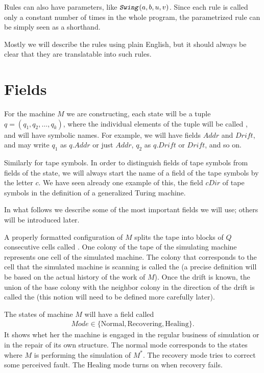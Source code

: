 \documentclass[12pt]{memoir}
\newcommand{\fld}[1]{\ensuremath{\textit{#1}}}
\newcommand{\rul}[1]{\ensuremath{\texttt{\slshape #1\/}}}
\newcommand{\Addr}{\fld{Addr}}
\newcommand{\cDir}{\fld{cDir}}
\newcommand{\Drift}{\fld{Drift}}
\newcommand{\Mode}{\fld{Mode}}
\newcommand{\Healing}{\mathrm{Healing}}
\newcommand{\Normal}{\mathrm{Normal}}
\newcommand{\Recovering}{\mathrm{Recovering}}
\newcommand{\ruSwing}{\rul{Swing}}
\begin{document}
Rules can also have parameters, like $\ruSwing(a,b,u,v)$.
Since each rule is called only a constant number of times in the whole program,
the parametrized rule can be simply seen as a shorthand.

Mostly we will describe
the rules using plain English, but it should always be clear that they
are translatable into such rules.


\section{Fields}\label{sec:fields}

\begin{sloppypar}
For the machine \( M \) we are constructing, each state will 
be a tuple \( q=(q_{1},q_{2},\dots,q_{k}) \),
where the individual elements of the tuple will be called , and will
have symbolic names.
For example, we will have fields \( \Addr \) and \( \Drift \),
and may write \( q_{1} \) as \( q.\Addr \) or just \( \Addr \), 
\( q_{2} \) as \( q.\Drift \) or \( \Drift \), and so on.
\end{sloppypar}

Similarly for tape symbols.
In order to distinguish fields of tape symbols from fields of the state,
we will always start the name of a field of the tape symbols by the letter \( c \).
We have seen already one example of this, the field \( \cDir \) of tape symbols
in the definition of a generalized Turing machine.

In what follows we describe some of the most important fields we will use;
others will be introduced later.

A properly formatted configuration of \( M \) splits the tape into blocks of \( Q \)
consecutive cells called .
One colony of the tape of the simulating
machine represents one cell of the simulated machine.
The colony that corresponds to the cell that the
simulated machine is scanning is called the 
(a precise definition will be based on the actual history of the work of \( M \)).
Once the drift is known, the union of the base colony with the neighbor colony in
the direction of the drift is called the  (this notion will 
need to be defined more carefully later).

The states of machine \( M \) will have a field called 
 \begin{align*}
   \Mode\in\{ \Normal,\Recovering, \Healing \}.
 \end{align*}
It shows whet her the machine is engaged in the regular business of simulation 
or in the repair of its own structure.
The normal mode corresponds to the states
where \( M \) is performing the simulation of \( M^{*} \).
The recovery mode tries to correct some perceived fault.
The \( \Healing \) mode turns on when recovery fails.
\end{document}
